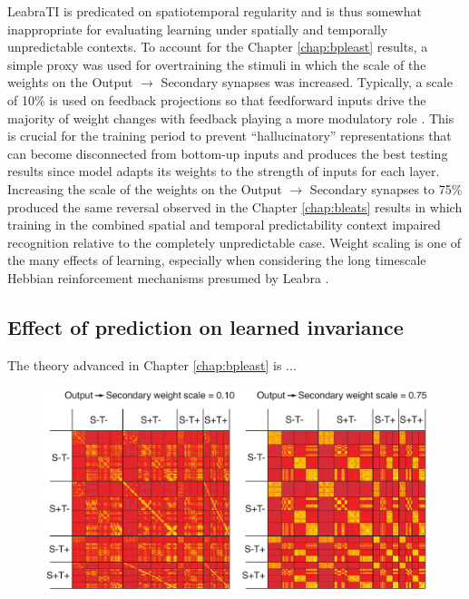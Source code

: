 \documentclass[dwyatte_dissertation.tex]{subfiles}
\begin{document}
LeabraTI is predicated on spatiotemporal regularity and is thus somewhat inappropriate for evaluating learning under spatially and temporally unpredictable contexts. To account for the Chapter \ref{chap:bpleast} results, a simple proxy was used for overtraining the stimuli in which the scale of the weights on the Output $\rightarrow$ Secondary synapses was increased. Typically, a scale of 10\% is used on feedback projections so that feedforward inputs drive the majority of weight changes with feedback  playing a more modulatory role \cite{CrickKoch98,ShermanGuillery98}. This is crucial for the training period to prevent ``hallucinatory'' representations that can become disconnected from bottom-up inputs and produces the best testing results since model adapts its weights to the strength of inputs for each layer. Increasing the scale of the weights on the Output $\rightarrow$ Secondary synapses to 75\% produced the same reversal observed in the Chapter \ref{chap:bleats} results in which training in the combined spatial and temporal predictability context impaired recognition relative to the completely unpredictable case. Weight scaling is one of the many effects of learning, especially when considering the long timescale Hebbian reinforcement mechanisms presumed by Leabra \cite{OReillyMunakata00,OReillyMunakataFrankEtAl12}.

\subsection{Effect of prediction on learned invariance}
The theory advanced in Chapter \ref{chap:bpleast} is ...

\begin{figure}[h!]
\begin{center}
\includegraphics[width=160mm]{figs/chap_sims/sims_out_distmatrix_annotated.pdf}
\end{center}
\caption{}{}
\label{fig:sims_distmatrix}
\end{figure}



\end{document}
